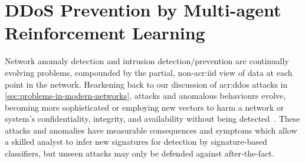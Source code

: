 \chapter{DDoS Prevention by Multi-agent Reinforcement Learning}\label{chap:ddos-rl}
Network anomaly detection and intrusion detection/prevention are continually evolving problems, compounded by the partial, non-\gls{acr:iid} view of data at each point in the network.
Hearkening back to our discussion of \gls{acr:ddos} attacks in \cref{sec:problems-in-modern-networks}, attacks and anomalous behaviours evolve, becoming more sophisticated or employing new vectors to harm a network or system's confidentiality, integrity, and availability without being detected~\parencite{DBLP:journals/comsur/BhuyanBK14}.
These attacks and anomalies have measurable consequences and symptoms which allow a skilled analyst to infer new signatures for detection by signature-based classifiers, but unseen attacks may only be defended against after-the-fact.


